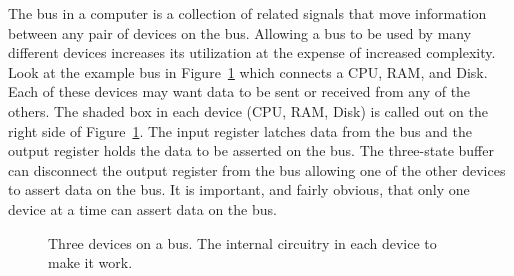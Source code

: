             The bus  in a computer is a collection
            of related signals that move information between any pair
            of devices on the bus.  Allowing a bus to be used by many
            different devices increases its utilization at the expense
            of increased complexity.  Look at the example bus in
            Figure~\ref{fig:comboBBbus} which connects a CPU, RAM, and Disk.
            Each of these devices may want data to be sent or
            received from any of the others.  The shaded box in each device
            (CPU, RAM, Disk) is called out on the right side of Figure~\ref{fig:comboBBbus}.
            The input register latches data from the bus and the output
            register holds the data to be asserted on the bus.  The
            three-state buffer can disconnect the output register from the bus
            allowing one of the other devices to assert data on the bus.
            It is important, and fairly obvious, that only one device at a
            time can assert data on the bus.

            \begin{figure}[ht]
                \caption{Three devices on a bus.  The internal circuitry in
                each device to make it work.}
                \label{fig:comboBBbus}
            \end{figure}


